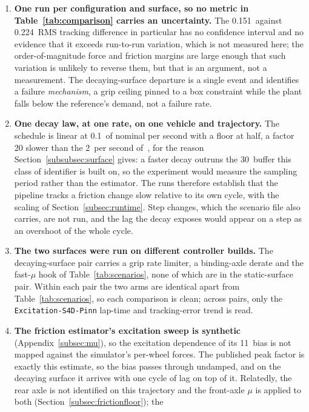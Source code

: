 \documentclass[lineno,12pt]{sn-jnl}
\makeatletter
\newif\ifsiu@prev
\DeclareRobustCommand{\siu@sep}{\ifsiu@prev\,\fi}
\DeclareRobustCommand{\siu@unit}[1]{\siu@sep\text{#1}\siu@prevtrue}
\DeclareRobustCommand{\siu@pre}[1]{\siu@sep\text{#1}\siu@prevfalse}
\DeclareRobustCommand{\siu@div}[1]{\text{#1}\siu@prevfalse}
\DeclareRobustCommand{\meter}{m}
\DeclareRobustCommand{\second}{s}
\DeclareRobustCommand{\gram}{g}
\DeclareRobustCommand{\newton}{N}
\DeclareRobustCommand{\radian}{rad}
\DeclareRobustCommand{\hertz}{Hz}
\DeclareRobustCommand{\percent}{\%}
\DeclareRobustCommand{\g}{\textit{g}}
\DeclareRobustCommand{\kilo}{k}
\DeclareRobustCommand{\milli}{m}
\DeclareRobustCommand{\per}{/}
\DeclareRobustCommand{\squared}{\ensuremath{^{2}}}
\providecommand{\degree}{\ensuremath{^{\circ}}}
\DeclareRobustCommand{\si}[1]{\begingroup
  \siu@prevfalse
  \renewcommand{\meter}{\siu@unit{m}}%
  \renewcommand{\second}{\siu@unit{s}}%
  \renewcommand{\gram}{\siu@unit{g}}%
  \renewcommand{\newton}{\siu@unit{N}}%
  \renewcommand{\radian}{\siu@unit{rad}}%
  \renewcommand{\hertz}{\siu@unit{Hz}}%
  \renewcommand{\percent}{\siu@unit{\%}}%
  \renewcommand{\degree}{\siu@unit{\ensuremath{^{\circ}}}}%
  \renewcommand{\g}{\siu@unit{\textit{g}}}%
  \renewcommand{\kilo}{\siu@pre{k}}%
  \renewcommand{\milli}{\siu@pre{m}}%
  \renewcommand{\per}{\siu@div{/}}%
  \renewcommand{\squared}{\ensuremath{^{2}}}%
  #1\endgroup}
\DeclareRobustCommand{\num}[1]{#1}
\DeclareRobustCommand{\SI}[2]{#1\,\si{#2}}
\newcommand{\oursarm}{\texttt{Excitation-\allowbreak S4D-\allowbreak Pinn}}
\theoremstyle{thmstyleone}%
\theoremstyle{thmstyletwo}%
\theoremstyle{thmstylethree}%
\makeatother
\begin{document}
\begin{enumerate}
\item \textbf{One run per configuration and surface, so no metric in
Table~\ref{tab:comparison} carries an uncertainty.} The \SI{0.151}{\meter}
against \SI{0.224}{\meter} RMS tracking difference in particular has no
confidence interval and no evidence that it exceeds run-to-run variation, which
is not measured here; the order-of-magnitude force and friction margins are
large enough that such variation is unlikely to reverse them, but that is an
argument, not a measurement. The decaying-surface departure is a single event
and identifies a failure \emph{mechanism}, a grip ceiling pinned to a box
constraint while the plant falls below the reference's demand, not a failure
rate.
\item \textbf{One decay law, at one rate, on one vehicle and trajectory.} The
schedule is linear at \SI{0.1}{\percent} of nominal per second with a floor at
half, a factor \num{20} slower than the \SI{2}{\percent} per second
of~\cite{llampc2025}, for the reason Section~\ref{subsubsec:surface} gives: a
faster decay outruns the \SI{30}{\second} buffer this class of identifier is
built on, so the experiment would measure the sampling period rather than the
estimator. The runs therefore establish that the pipeline tracks a friction
change slow relative to its own cycle, with the scaling of
Section~\ref{subsec:runtime}. Step changes, which the scenario file also
carries, are not run, and the lag the decay exposes would appear on a step as
an overshoot of the whole cycle.
\item \textbf{The two surfaces were run on different controller builds.} The
decaying-surface pair carries a grip rate limiter, a binding-axle derate and the
fast-$\mu$ hook of Table~\ref{tab:scenarios}, none of which are in the
static-surface pair. Within each pair the two arms are identical apart from
Table~\ref{tab:scenarios}, so each comparison is clean; across pairs, only the
\oursarm{} lap-time and tracking-error trend is read.
\item \textbf{The friction estimator's excitation sweep is synthetic}
(Appendix~\ref{subsec:mu}), so the excitation dependence of its
\SI{11}{\percent} bias is not mapped against the simulator's per-wheel forces.
The published peak factor is exactly this estimate, so the bias passes through
undamped, and on the decaying surface it arrives with one cycle of lag on top
of it. Relatedly, the rear axle is not identified on this trajectory and the
front-axle $\mu$ is applied to both (Section~\ref{subsec:frictionfloor}); the

\end{enumerate}
\end{document}
